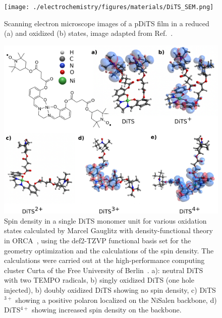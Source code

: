 \begin{figure}[!h]
\center
	\texttt{[image: ./electrochemistry/figures/materials/DiTS\_SEM.png]}
	\caption{Scanning electron microscope images of a pDiTS film in a reduced (a) and oxidized (b) states, image adapted from Ref.~\cite{Vereshchagin2020}.}
	\label{fig:Figure_1}
\end{figure}

\begin{figure}[h]
\center
	\includegraphics[width=1\textwidth]{./electrochemistry/figures/DFT_DITS.pdf}
	\caption{Spin density in a single DiTS monomer unit for various oxidation states calculated by Marcel Gauglitz with density-functional theory in ORCA~\cite{ORCA}, using the def2-TZVP functional basis set for the geometry optimization and the calculations of the spin density. The calculations were carried out at the high-performance computing cluster Curta of the Free University of Berlin~\cite{Curta}. a): neutral DiTS with two TEMPO radicals, b) singly oxidized DiTS (one hole injected), b) doubly oxidized DiTS showing no spin density, c) DiTS$^{3+}$ showing a positive polaron localized on the NiSalen backbone, d) DiTS$^{4+}$ showing increased spin density on the backbone.}
	\label{fig:DiTS_DFT}
\end{figure}



